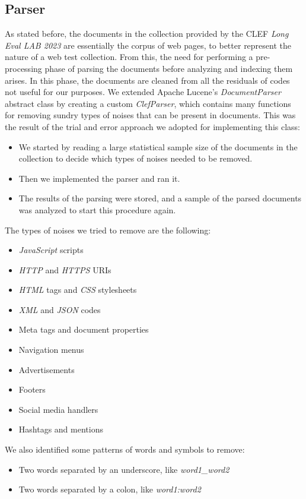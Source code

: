 \begin{itemize}
\subsection{Parser}
As stated before, the documents in the collection provided by the \ac{CLEF} \textit{Long Eval LAB 2023} are essentially the corpus of web pages, to better represent the nature of a web test collection. From this, the need for performing a pre-processing phase of parsing the documents before analyzing and indexing them arises.
In this phase, the documents are cleaned from all the residuals of codes not useful for our purposes. We extended Apache Lucene's \textit{DocumentParser} abstract class by creating a custom \textit{ClefParser}, which contains many functions for removing sundry types of noises that can be present in documents. This was the result of the trial and error approach we adopted for implementing this class:
\begin{itemize}
\item We started by reading a large statistical sample size of the documents in the collection to decide which types of noises needed to be removed.
\item Then we implemented the parser and ran it.
\item The results of the parsing were stored, and a sample of the parsed documents was analyzed to start this procedure again.
\end{itemize}
The types of noises we tried to remove are the following:
\begin{itemize}
\item \textit{JavaScript} scripts
\item \textit{HTTP} and \textit{HTTPS} URIs
\item \textit{HTML} tags and \textit{CSS} stylesheets
\item \textit{XML} and \textit{JSON} codes
\item Meta tags and document properties
\item Navigation menus
\item Advertisements
\item Footers
\item Social media handlers
\item Hashtags and mentions
\end{itemize}
We also identified some patterns of words and symbols to remove:
\begin{itemize}
\item Two words separated by an underscore, like \textit{word1\_word2}
\item Two words separated by a colon, like \textit{word1:word2}

\end{itemize}
\end{itemize}
